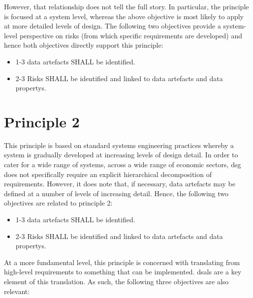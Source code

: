 However, that relationship does not tell the full story. In particular, the principle is focused at a system level, whereas the above objective is most likely to apply at more detailed levels of design. The following two objectives provide a system-level perspective on risks (from which specific requirements are developed) and hence both objectives directly support this principle:

\begin{itemize}
	\item \textcolor{dsiwgAccentColour}{1-3} \Glspl{data artefact} SHALL be identified.
	\item \textcolor{dsiwgAccentColour}{2-3} Risks SHALL be identified and linked to \glspl{data artefact} and \glspl{data property}.
\end{itemize}


\section{Principle 2}

This principle is based on standard systems engineering practices whereby a system is gradually developed at increasing levels of design detail. In order to cater for a wide range of systems, across a wide range of economic sectors, \gls{dsg} does not specifically require an explicit hierarchical decomposition of requirements. However, it does note that, if necessary, \glspl{data artefact} may be defined at a number of levels of increasing detail. Hence, the following two objectives are related to principle 2:

\begin{itemize}
	\item \textcolor{dsiwgAccentColour}{1-3} \Glspl{data artefact} SHALL be identified.
	\item \textcolor{dsiwgAccentColour}{2-3} Risks SHALL be identified and linked to \glspl{data artefact} and \glspl{data property}.
\end{itemize}

At a more fundamental level, this principle is concerned with translating from high-level requirements to something that can be implemented. \Glspl{dsal} are a key element of this translation. As such, the following three objectives are also relevant:

